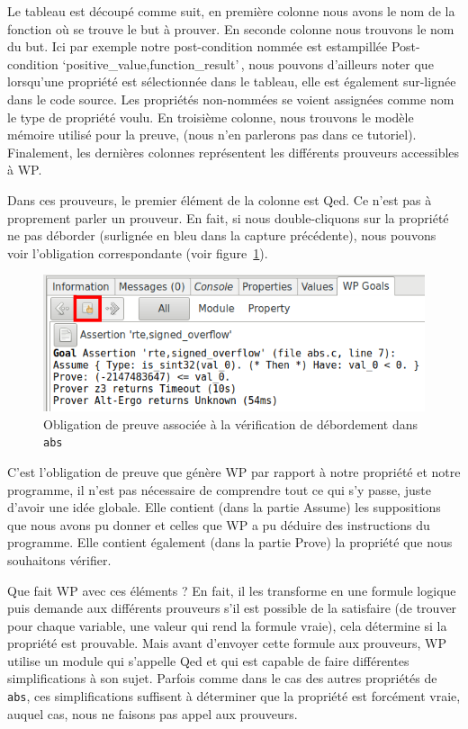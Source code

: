 \documentclass[12pt,francais,]{scrbook}
\begin{document}
Le tableau est découpé comme suit, en première colonne nous avons le nom
de la fonction où se trouve le but à prouver. En seconde colonne nous
trouvons le nom du but. Ici par exemple notre post-condition nommée est
estampillée \og{}Post-condition `positive\_value,function\_result'\,\fg{},
nous pouvons d'ailleurs noter que lorsqu'une propriété est sélectionnée
dans le tableau, elle est également sur-lignée dans le code source. Les
propriétés non-nommées se voient assignées comme nom le type de
propriété voulu. En troisième colonne, nous trouvons le modèle mémoire
utilisé pour la preuve, (nous n'en parlerons pas dans ce tutoriel).
Finalement, les dernières colonnes représentent les différents prouveurs
accessibles à WP.

Dans ces prouveurs, le premier élément de la colonne est Qed. Ce n'est
pas à proprement parler un prouveur. En fait, si nous double-cliquons
sur la propriété \og{}ne pas déborder\fg{} (surlignée en bleu dans la capture
précédente), nous pouvons voir l'obligation correspondante (voir
figure~\ref{fig:2-1-1-abs-6}).

\begin{figure}[htbp]
\centering
\includegraphics[scale=0.5]{2-1-1-abs-6.png}
\caption{Obligation de preuve associée à la vérification de débordement
dans \texttt{abs}}
\label{fig:2-1-1-abs-6}
\end{figure}

C'est l'obligation de preuve que génère WP par rapport à notre propriété
et notre programme, il n'est pas nécessaire de comprendre tout ce qui
s'y passe, juste d'avoir une idée globale. Elle contient (dans la partie
\og{}Assume\fg{}) les suppositions que nous avons pu donner et celles que WP a
pu déduire des instructions du programme. Elle contient également (dans
la partie \og{}Prove\fg{}) la propriété que nous souhaitons vérifier.

Que fait WP avec ces éléments ? En fait, il les transforme en une
formule logique puis demande aux différents prouveurs s'il est possible
de la satisfaire (de trouver pour chaque variable, une valeur qui rend
la formule vraie), cela détermine si la propriété est prouvable. Mais
avant d'envoyer cette formule aux prouveurs, WP utilise un module qui
s'appelle Qed et qui est capable de faire différentes simplifications à
son sujet. Parfois comme dans le cas des autres propriétés de
\texttt{abs}, ces simplifications suffisent à déterminer que la
propriété est forcément vraie, auquel cas, nous ne faisons pas appel aux
prouveurs.
\end{document}
